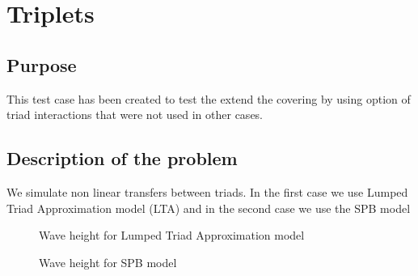 \section{Triplets}
%
%
\subsection{Purpose}
%
This test case has been created to test the extend the covering by using option of triad interactions that were not used in other cases.

%
\subsection{Description of the problem}
We simulate non linear transfers between triads. In the first case we use Lumped Triad Approximation model (LTA) and in the second case we use the SPB model
\begin{figure} [!h]
\centering
{}
 \caption{Wave height for Lumped Triad Approximation model}
\label{figrestripl}
\end{figure}
\begin{figure} [!h]
\centering
{}
 \caption{Wave height for SPB model}
\label{figrestripl2}
\end{figure}
